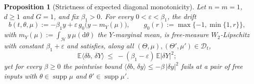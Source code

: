 \documentclass[preprint,12pt]{elsarticle}
\newcommand{\E}{\mathbb{E}}
\newcommand{\diff}{\mathrm{d}}
\newcommand{\inner}[2]{\langle #1,\,#2\rangle}
\numberwithin{equation}{section}
\theoremstyle{plain}
\newtheorem{proposition}[theorem]{Proposition}
\theoremstyle{definition}
\theoremstyle{\PaperRemarkStyle}
\begin{document}
\begin{proposition}[Strictness of expected diagonal monotonicity]\label{prop:strict}
Let $n=m=1$, $d\ge1$ and $G=1$, and fix $\beta_1>0$. For every $0<\varepsilon<\beta_1$,
the drift
\begin{equation}\label{eq:bmean}
b(t,\theta,\mu):=-\beta_1 y+\varepsilon\,g_0\bigl(y-m_Y(\mu)\bigr),\qquad
g_0(r):=\max\{-1,\min\{1,r\}\},
\end{equation}
with $m_Y(\mu):=\int_{\mathcal H}y\,\mu(\diff\theta)$ the $Y$-marginal mean, is
free-measure $W_2$-Lipschitz with constant $\beta_1+\varepsilon$ and satisfies, along
all $(\Theta,\mu),(\Theta',\mu')\in\mathcal D_t$,
\begin{equation}\label{eq:diagdrift}
\E\inner{\delta b}{\delta Y}\ \le\ -(\beta_1-\varepsilon)\,\E|\delta Y|^2 ;
\end{equation}
yet for every $\beta\ge0$ the pointwise bound
$\inner{\delta b}{\delta y}\le-\beta\,|\delta y|^2$ fails at a pair of free inputs with
$\theta\in\operatorname{supp}\mu$ and $\theta'\in\operatorname{supp}\mu'$.
\end{proposition}
\end{document}
